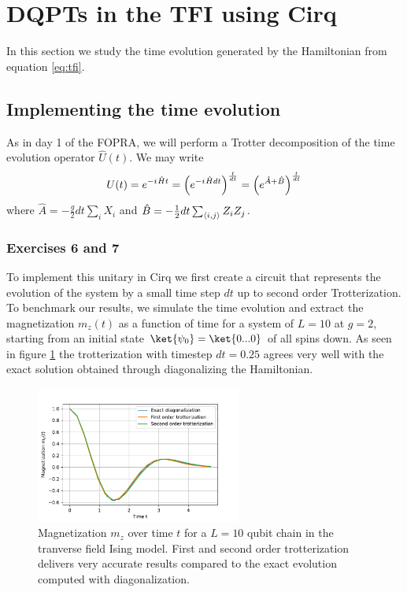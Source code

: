 \section{DQPTs in the TFI using Cirq}
In this section we study the time evolution generated by the Hamiltonian from equation \eqref{eq:tfi}.
\subsection{Implementing the time evolution}
As in day 1 of the FOPRA, we will perform a Trotter decomposition of the time evolution operator $\hat{U}(t)$. We may write 
\begin{equation}
U(t) = e^{-{i\mkern1mu}\hat{H}t} = \left(e^{-{i\mkern1mu}\hat{H}dt}\right)^{\frac{t}{dt}} = \left(e^{\hat{A}+\hat{B}}\right)^\frac{t}{dt}
\end{equation}
where $\hat{A} = -\frac{g}{2}dt \sum_i X_i$ and $\hat{B} = -\frac{1}{2}dt \sum_{\langle i,j \rangle}Z_iZ_j$.
\subsubsection{Exercises 6 and 7}
To implement this unitary in Cirq we first create a circuit that represents the evolution of the system by a small time step $dt$ up to second order Trotterization. To benchmark our results, we simulate the time evolution and extract the magnetization $m_z(t)$ as a function of time for a system of $L=10$ at $g=2$, starting from an initial state $\ket{\psi_0} = \ket{0...0}$ of all spins down. As seen in figure \ref{fig:ex6d2} the trotterization with timestep $dt = 0.25$ agrees very well with the exact solution obtained through diagonalizing the Hamiltonian.
\begin{figure}[h]
    \centering
    \includegraphics[width=0.6\textwidth]{tex/figures/Ex6d2.pdf}
    \caption{Magnetization $m_z$ over time $t$ for a $L = 10$ qubit chain in the tranverse field Ising model. First and second order trotterization delivers very accurate results compared to the exact evolution computed with diagonalization.}
    \label{fig:ex6d2}
\end{figure}

